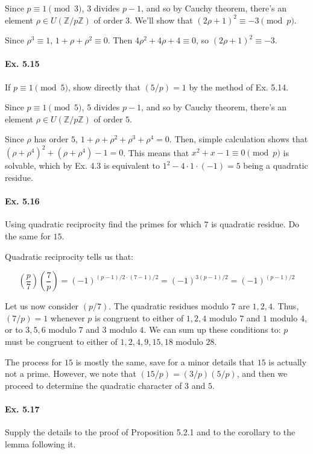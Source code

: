 \documentclass[notitlepage]{article}
\theoremstyle{definition}
\newcommand\Z{\mathbb{Z}}
\begin{document}
Since $p \equiv 1 \pmod 3$, $3$ divides $p-1$, and so by Cauchy
theorem, there's an element $\rho \in U(\Z/p\Z)$ of order $3$. We'll
show that $(2 \rho + 1)^2 \equiv -3 \pmod p$.

Since $\rho^3 \equiv 1$, $1 + \rho + \rho^2 \equiv 0$. Then $4 \rho^2
+ 4 \rho + 4 \equiv 0$, so $(2 \rho + 1)^2 \equiv -3$.

\paragraph{Ex. 5.15}
If $p \equiv 1 \pmod 5$, show directly that $(5/p) = 1$ by the method
of Ex. 5.14.

Since $p \equiv 1 \pmod 5$, $5$ divides $p-1$, and so by Cauchy
theorem, there's an element $\rho \in U(\Z/p\Z)$ of order $5$.

Since $\rho$ has order $5$, $1 + \rho + \rho^2 + \rho^3 + \rho^4 =
0$. Then, simple calculation shows that $(\rho + \rho^4)^2 + (\rho +
\rho^4) - 1 = 0$. This means that $x^2 + x - 1 \equiv 0 \pmod p$ is
solvable, which by Ex. 4.3 is equivalent to $1^2 - 4\cdot1\cdot(-1) =
5$ being a quadratic residue.

\paragraph{Ex. 5.16}
Using quadratic reciprocity find the primes for which $7$ is quadratic
residue. Do the same for $15$.

Quadratic reciprocity tells us that:

\begin{equation}
  \left(\frac{p}{7}\right)\left(\frac{7}{p}\right) = (-1)^{(p-1)/2
    \cdot (7-1)/2} = (-1)^{3(p-1)/2} = (-1)^{(p-1)/2}
\end{equation}

Let us now consider $(p/7)$. The quadratic residues modulo $7$ are $1,
2, 4$. Thus, $(7/p) = 1$ whenever $p$ is congruent to either of $1, 2,
4$ modulo $7$ and $1$ modulo $4$, or to $3, 5, 6$ modulo $7$ and $3$
modulo $4$. We can sum up these conditions to: $p$ must be congruent
to either of $1, 2, 4, 9, 15, 18$ modulo $28$.

The process for $15$ is mostly the same, save for a minor details that
$15$ is actually not a prime. However, we note that $(15/p) =
(3/p)(5/p)$, and then we proceed to determine the quadratic character
of $3$ and $5$.

\paragraph{Ex. 5.17}
Supply the details to the proof of Proposition 5.2.1 and to the corollary to the lemma
following it.
\end{document}
